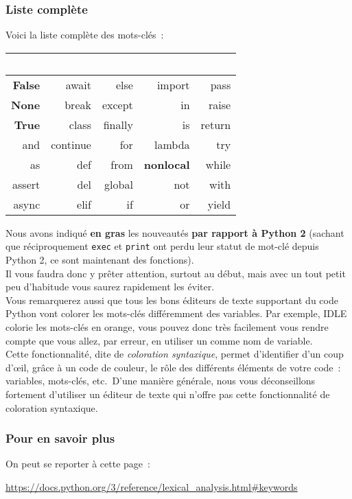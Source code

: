     \hypertarget{liste-compluxe8te}{%
\subsubsection{Liste complète}\label{liste-compluxe8te}}

    Voici la liste complète des mots-clés~:

    \begin{longtable}[]{@{}rrrrr@{}}
\toprule
~ & ~ & ~ & ~ & ~\tabularnewline
\midrule
\endhead
\textbf{False} & await & else & import & pass\tabularnewline
\textbf{None} & break & except & in & raise\tabularnewline
\textbf{True} & class & finally & is & return\tabularnewline
and & continue & for & lambda & try\tabularnewline
as & def & from & \textbf{nonlocal} & while\tabularnewline
assert & del & global & not & with\tabularnewline
async & elif & if & or & yield\tabularnewline
\bottomrule
\end{longtable}

    Nous avons indiqué \textbf{en gras} les nouveautés \textbf{par rapport à
Python 2} (sachant que réciproquement \texttt{exec} et \texttt{print}
ont perdu leur statut de mot-clé depuis Python 2, ce sont maintenant des
fonctions).\\

    Il vous faudra donc y prêter attention, surtout au début, mais avec un
tout petit peu d'habitude vous saurez rapidement les éviter.\\

Vous remarquerez aussi que tous les bons éditeurs de texte supportant du
code Python vont colorer les mots-clés différemment des variables. Par
exemple, IDLE colorie les mots-clés en orange, vous pouvez donc très
facilement vous rendre compte que vous allez, par erreur, en utiliser un
comme nom de variable.\\

Cette fonctionnalité, dite de \emph{coloration syntaxique}, permet
d'identifier d'un coup d'œil, grâce à un code de couleur, le rôle des
différents éléments de votre code~: variables, mots-clés, etc.~D'une
manière générale, nous vous déconseillons fortement d'utiliser un
éditeur de texte qui n'offre pas cette fonctionnalité de coloration
syntaxique.

    \hypertarget{pour-en-savoir-plus}{%
\subsubsection{Pour en savoir plus}\label{pour-en-savoir-plus}}

    On peut se reporter à cette page~:

\href{https://docs.python.org/3/reference/lexical\_analysis.html\#keywords}{https://docs.python.org/3/reference/lexical\_analysis.html\#keywords}